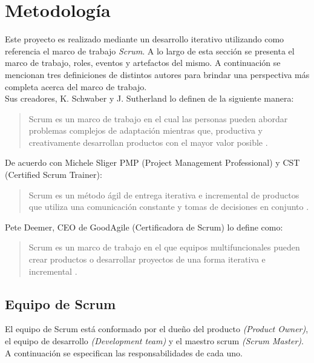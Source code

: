 \section{Metodología}

 Este proyecto es realizado mediante un desarrollo iterativo utilizando como referencia
 el marco de trabajo {\it Scrum}. A lo largo de esta sección se presenta el marco de trabajo,
 roles, eventos y artefactos del mismo. A continuación se mencionan tres definiciones
 de distintos autores para brindar una perspectiva más completa acerca del marco de trabajo.\\

    \noindent Sus creadores, K. Schwaber y J. Sutherland lo definen de la siguiente manera:
        \begin{quote}
        Scrum es un marco de trabajo en el cual las personas pueden abordar
        problemas complejos de adaptación mientras que, productiva y creativamente
        desarrollan productos con el mayor valor posible \cite{TheScrumGuide}.
        \end{quote}

    \noindent De acuerdo con Michele Sliger PMP (Project Management Professional) y CST (Certified
     Scrum Trainer):
        \begin{quote}
        Scrum es un método ágil de entrega iterativa e incremental de productos que
        utiliza una comunicación constante y tomas de decisiones en conjunto \cite{Sliger1}.
        \end{quote}

    \noindent Pete Deemer, CEO de GoodAgile (Certificadora de Scrum) lo define como:
        \begin{quote}
        Scrum es un marco de trabajo en el que equipos multifuncionales pueden crear productos
        o desarrollar proyectos de una forma iterativa e incremental \cite{ScrumPrimer}.
        \end{quote}


\clearpage

\subsection{Equipo de Scrum}

 El equipo de Scrum está conformado por el dueño del producto {\em(Product Owner)}, el equipo
 de desarrollo {\em(Development team)} y el maestro scrum {\em(Scrum Master)}. A continuación
 se especifican las responsabilidades de cada uno.

